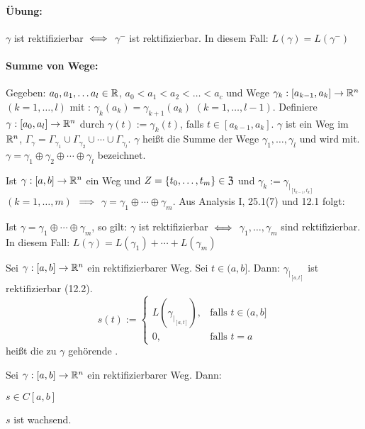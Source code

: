 \documentclass[a4paper,twoside,DIV15,BCOR12mm,chapterprefix=true,headings=twolinechapter]{scrbook}
\begin{document}
\paragraph{Übung:} $\gamma$ ist rektifizierbar $\iff$ $\gamma^-$ ist rektifizierbar. In diesem Fall: \mbox{$L(\gamma) = L(\gamma^-)$}

\paragraph{Summe von Wege:}Gegeben: $a_0, a_1,\ldots a_l \in \mathbb{R}$, $a_0<a_1<a_2<\ldots<a_c$ und Wege $\gamma_k:[a_{k-1},a_k] \to \mathbb{R}^n$ $(k=1,\ldots,l)$ mit : $\gamma_k(a_k) = \gamma_{k+1}(a_k)$ $(k=1,\ldots,l-1)$.
Definiere $\gamma:[a_0,a_l]\to\mathbb{R}^n$ durch $\gamma(t):=\gamma_k(t)$, falls $t\in[a_{k-1},a_k]$. $\gamma$ ist ein Weg im $\mathbb{R}^n$, $\Gamma_\gamma = \Gamma_{\gamma_1} \cup \Gamma_{\gamma_2} \cup \cdots \cup \Gamma_{\gamma_l}$. $\gamma$ heißt die Summe der Wege $\gamma_1,\ldots,\gamma_l$ und wird mit. $\gamma = \gamma_1 \oplus \gamma_2 \oplus \cdots \oplus \gamma_l$ bezeichnet. 

\begin{bemerkung}
Ist $\gamma:[a,b]\to\mathbb{R}^n$ ein Weg und $Z=\{t_0,\ldots,t_m\}\in\mathfrak{Z}$ und $\gamma_k:=\gamma_{|_{[t_{k-1},t_k]}}$ $(k=1,\ldots,m)$ $\implies$ $\gamma = \gamma_1 \oplus \cdots \oplus \gamma_m$. Aus Analysis I, 25.1(7) und 12.1 folgt: 
\end{bemerkung}

\begin{satz}
Ist $\gamma = \gamma_1 \oplus \cdots \oplus \gamma_m$, so gilt: $\gamma$ ist rektifizierbar $\iff$ $\gamma_1,\ldots,\gamma_m$ sind rektifizierbar. In diesem Fall: $L(\gamma)=L(\gamma_1) + \cdots + L(\gamma_m)$
\end{satz}

\begin{definition}
Sei $\gamma:[a,b]\to\mathbb{R}^n$ ein rektifizierbarer Weg. Sei $t\in(a,b]$. Dann: $\gamma_{|_{[a,t]}}$ ist rektifizierbar (12.2).
$$s(t):= \begin{cases}L(\gamma_{|_{[a,t]}}),&\text{falls }t\in(a,b] \\0, &\text{falls }t=a\end{cases}$$ heißt die zu $\gamma$ gehörende .
\end{definition}

\begin{satz}
Sei $\gamma:[a,b]\to\mathbb{R}^n$ ein rektifizierbarer Weg. Dann: 
\begin{liste}
\item $s\in C[a,b]$
\item $s$ ist wachsend.
\end{liste}
\end{satz}
\end{document}

